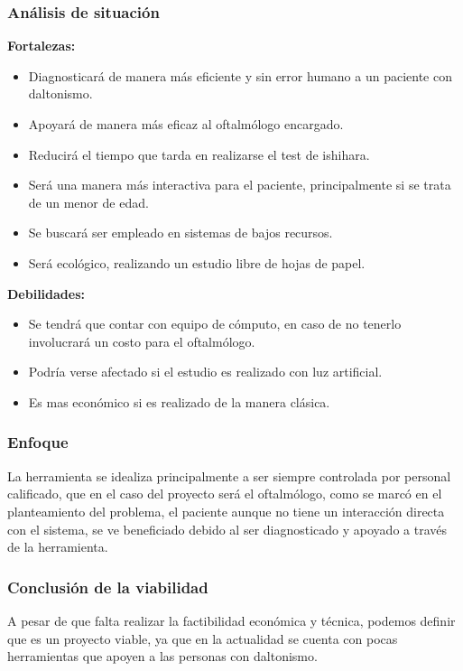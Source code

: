 \documentclass[10pt]{article}
\begin{document}
\subsubsection{Análisis de situación}

\textbf{Fortalezas:}
\begin{itemize}
    \item Diagnosticará de manera más eficiente y sin error humano a un paciente con daltonismo.
    \item Apoyará de manera más eficaz al oftalmólogo encargado.
    \item Reducirá el tiempo que tarda en realizarse el test de ishihara.
    \item Será una manera más interactiva para el paciente, principalmente si se trata de un menor de edad.
    \item Se buscará ser empleado en sistemas de bajos recursos.
    \item Será ecológico, realizando un estudio libre de hojas de papel.
\end{itemize}


\textbf{Debilidades:}
\begin{itemize}
    \item Se tendrá que contar con equipo de cómputo, en caso de no tenerlo involucrará un costo para el oftalmólogo.
    \item Podría verse afectado si el estudio es realizado con luz artificial.
   \item  Es mas económico si es realizado de la manera clásica.
\end{itemize}

\subsubsection{Enfoque}

La herramienta se idealiza principalmente a ser siempre controlada por personal calificado, que en el caso del proyecto será el oftalmólogo, como se marcó en el planteamiento del problema, el paciente aunque no tiene un interacción directa con el sistema, se ve beneficiado debido al ser diagnosticado y apoyado a través de la herramienta.

\subsubsection{Conclusión de la viabilidad}

A pesar de que falta realizar la factibilidad económica y técnica, podemos definir que es un proyecto viable, ya que en la actualidad se cuenta con pocas herramientas que apoyen a las personas con daltonismo.
\end{document}
